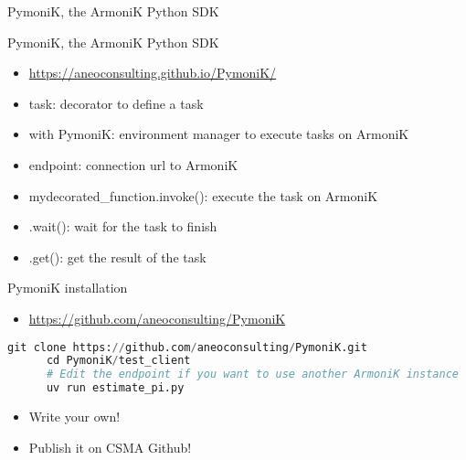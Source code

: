 \documentclass[10pt,aspectratio=1609]{beamer}
\begin{document}
\begin{section}{PymoniK, the ArmoniK Python SDK}
  \begin{frame}[fragile]{PymoniK, the ArmoniK Python SDK}
    \begin{itemize}
      \item \url{https://aneoconsulting.github.io/PymoniK/}
      \item task: decorator to define a task
      \item with PymoniK: environment manager to execute tasks on ArmoniK 
      \item endpoint: connection url to ArmoniK
      \item mydecorated_function.invoke(): execute the task on ArmoniK
      \item .wait(): wait for the task to finish
      \item .get(): get the result of the task 
    \end{itemize}
  \end{frame}

  \begin{frame}[fragile]{PymoniK installation}
    \begin{itemize}
      \item \url{https://github.com/aneoconsulting/PymoniK}
    \end{itemize}

    \begin{lstlisting}[language=Python, caption=Run PymoniK exemple]
      git clone https://github.com/aneoconsulting/PymoniK.git
      cd PymoniK/test_client
      # Edit the endpoint if you want to use another ArmoniK instance
      uv run estimate_pi.py
    \end{lstlisting}

    \begin{itemize}
      \item Write your own!
      \item Publish it on CSMA Github!
    \end{itemize}
  \end{frame}
\end{section}
\end{document}
